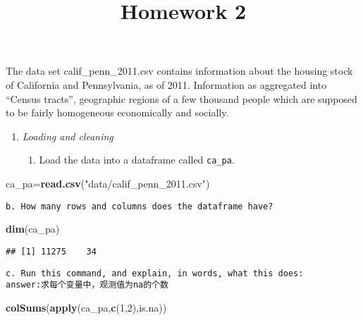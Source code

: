 \documentclass[
]{article}
\title{Homework 2}
\author{}
\date{\vspace{-2.5em}}
\newenvironment{Shaded}{\begin{snugshade}}{\end{snugshade}}
\newcommand{\DecValTok}[1]{\textcolor[rgb]{0.00,0.00,0.81}{#1}}
\newcommand{\KeywordTok}[1]{\textcolor[rgb]{0.13,0.29,0.53}{\textbf{#1}}}
\newcommand{\NormalTok}[1]{#1}
\newcommand{\StringTok}[1]{\textcolor[rgb]{0.31,0.60,0.02}{#1}}
\providecommand{\tightlist}{%
  \setlength{\itemsep}{0pt}\setlength{\parskip}{0pt}}
\begin{document}
\maketitle

The data set calif\_penn\_2011.csv contains information about the
housing stock of California and Pennsylvania, as of 2011. Information as
aggregated into ``Census tracts'', geographic regions of a few thousand
people which are supposed to be fairly homogeneous economically and
socially.

\begin{enumerate}
\def\labelenumi{\arabic{enumi}.}
\tightlist
\item
  \emph{Loading and cleaning}

  \begin{enumerate}
  \def\labelenumii{\alph{enumii}.}
  \tightlist
  \item
    Load the data into a dataframe called \texttt{ca\_pa}.
  \end{enumerate}
\end{enumerate}

\begin{Shaded}
\begin{Highlighting}[]
\NormalTok{ca_pa=}\KeywordTok{read.csv}\NormalTok{(}\StringTok{"data/calif_penn_2011.csv"}\NormalTok{)}
\end{Highlighting}
\end{Shaded}

\begin{verbatim}
b. How many rows and columns does the dataframe have?
\end{verbatim}

\begin{Shaded}
\begin{Highlighting}[]
\KeywordTok{dim}\NormalTok{(ca_pa)}
\end{Highlighting}
\end{Shaded}

\begin{verbatim}
## [1] 11275    34
\end{verbatim}

\begin{verbatim}
c. Run this command, and explain, in words, what this does:
answer:求每个变量中，观测值为na的个数
\end{verbatim}

\begin{Shaded}
\begin{Highlighting}[]
\KeywordTok{colSums}\NormalTok{(}\KeywordTok{apply}\NormalTok{(ca_pa,}\KeywordTok{c}\NormalTok{(}\DecValTok{1}\NormalTok{,}\DecValTok{2}\NormalTok{),is.na))}
\end{Highlighting}
\end{Shaded}
\end{document}
